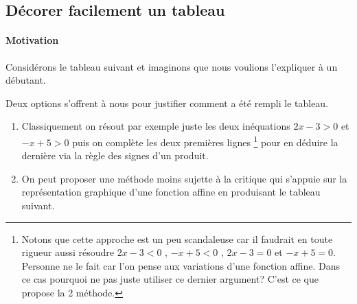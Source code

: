 \documentclass[12pt,a4paper]{article}
\begin{document}
%

\subsection{Décorer facilement un tableau}

\paragraph{Motivation}

Considérons le tableau suivant et imaginons que nous voulions l'expliquer à un débutant.

\begin{center}
\end{center}

Deux options s'offrent à nous pour justifier comment a été rempli le tableau.

\begin{enumerate}
    \item Classiquement on résout par exemple juste les deux inéquations $2 x - 3 > 0$ et $-x + 5 > 0$ puis on complète les deux premières lignes
    \footnote{
        Notons que cette approche est un peu scandaleuse car il faudrait en toute rigueur aussi résoudre
        $2 x - 3 < 0$ , $-x + 5 < 0$ , $2 x - 3 = 0$ et $-x + 5 = 0$.
        Personne ne le fait car l'on pense aux variations d'une fonction affine. Dans ce cas pourquoi ne pas juste utiliser ce dernier argument?
        C'est ce que propose la 2\ieme{} méthode.
    }
    pour en déduire la dernière via la règle des signes d'un produit.

    \item On peut proposer une méthode moins sujette à la critique qui s'appuie sur la représentation graphique d'une fonction affine en produisant le tableau suivant.
\end{enumerate}
\end{document}
